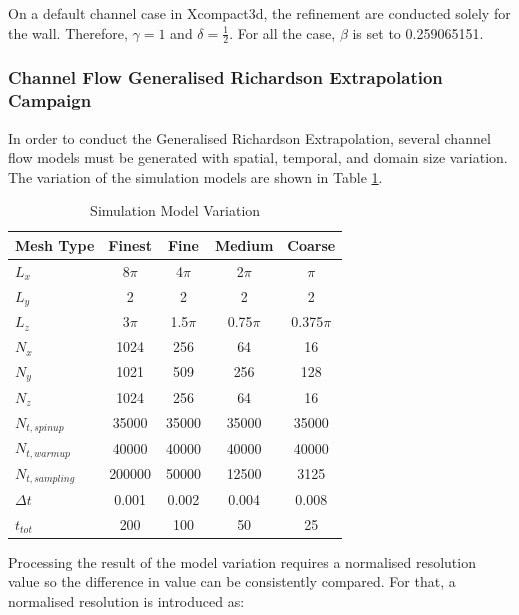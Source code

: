 On a default channel case in Xcompact3d, the refinement are conducted solely for the wall. Therefore, $\gamma = 1$ and $\delta = \frac12$. For all the case, $\beta$ is set to 0.259065151.



\subsubsection{Channel Flow Generalised Richardson Extrapolation Campaign}
\label{sec:GREP}
In order to conduct the Generalised Richardson Extrapolation, several channel flow models must be generated with spatial, temporal, and domain size variation. The variation of the simulation models are shown in Table \ref{tab:simmodvar}.

\begin{table}[h!]
	\centering
	\caption{Simulation Model Variation}
	\label{tab:simmodvar}
	\begin{tabular}{lcccc}
		\hline
		\textbf{Mesh Type}       & Finest    & Fine      & Medium   & Coarse   \\ \hline
		\textbf{$L_x$}              & 8$\pi$ & 4$\pi$ & 2$\pi$ & $\pi$ \\
		\textbf{$L_y$}              & 2         & 2         & 2        & 2        \\
		\textbf{$L_z$}              & 3$\pi$  & 1.5$\pi$  & 0.75$\pi$ & 0.375$\pi$ \\
		\textbf{$N_x$}              & 1024      & 256       & 64       & 16       \\
		\textbf{$N_y$}              & 1021      & 509       & 256      & 128      \\
		\textbf{$N_z$}              & 1024      & 256       & 64       & 16       \\
		\textbf{$N_{t, spinup}$}   & 35000     & 35000     & 35000    & 35000    \\
		\textbf{$N_{t, warmup}$}   & 40000     & 40000     & 40000    & 40000    \\
		\textbf{$N_{t, sampling}$} & 200000    & 50000     & 12500    & 3125     \\
		\textbf{$\Delta t$}        & 0.001     & 0.002     & 0.004    & 0.008    \\
		\textbf{$t_{tot}$}               & 200       & 100       & 50       & 25       \\ \hline
	\end{tabular}
\end{table}

Processing the result of the model variation requires a normalised resolution value so the difference in value can be consistently compared. For that, a normalised resolution is introduced as:

